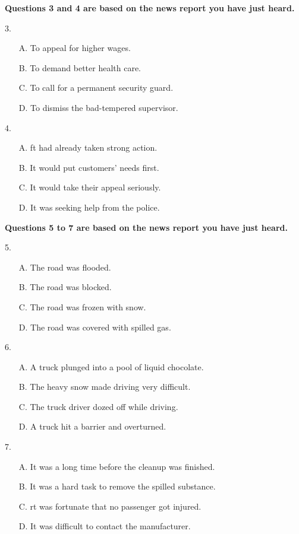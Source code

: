 \documentclass[UTF8,11pt]{ctexart}
\begin{document}
\textbf{Questions 3 and 4 are based on the news report you have just heard.}


3.


\begin{itemize}[leftmargin=2em,itemsep=.2em,topsep=.4em]\item[A.] To appeal for higher wages.
\item[B.] To demand better health care.
\item[C.] To call for a permanent security guard.
\item[D.] To dismiss the bad-tempered supervisor.
\end{itemize}

4.


\begin{itemize}[leftmargin=2em,itemsep=.2em,topsep=.4em]\item[A.] ft had already taken strong action.
\item[B.] It would put customers' needs first.
\item[C.] It would take their appeal seriously.
\item[D.] It was seeking help from the police.
\end{itemize}

\textbf{Questions 5 to 7 are based on the news report you have just heard.}


5.


\begin{itemize}[leftmargin=2em,itemsep=.2em,topsep=.4em]\item[A.] The road was flooded.
\item[B.] The road was blocked.
\item[C.] The road was frozen with snow.
\item[D.] The road was covered with spilled gas.
\end{itemize}

6.


\begin{itemize}[leftmargin=2em,itemsep=.2em,topsep=.4em]\item[A.] A truck plunged into a pool of liquid chocolate.
\item[B.] The heavy snow made driving very difficult.
\item[C.] The truck driver dozed off while driving.
\item[D.] A truck hit a barrier and overturned.
\end{itemize}

7.


\begin{itemize}[leftmargin=2em,itemsep=.2em,topsep=.4em]\item[A.] It was a long time before the cleanup was finished.
\item[B.] It was a hard task to remove the spilled substance.
\item[C.] rt was fortunate that no passenger got injured.
\item[D.] It was difficult to contact the manufacturer.
\end{itemize}
\end{document}
